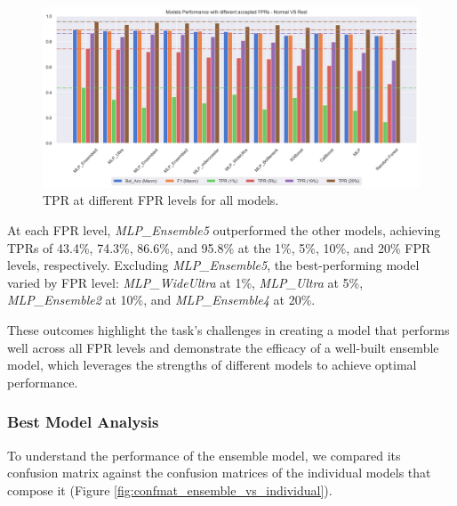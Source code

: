 \begin{figure}[htpb]
    \centering
    \includegraphics[width=1\textwidth]{./images/nomrVSrest_all.png}
    \caption{TPR at different FPR levels for all models.}
    \label{fig:normVSrest_all}
\end{figure}

At each FPR level, \textit{MLP\_Ensemble5} outperformed the other models, 
achieving TPRs of 43.4\%, 74.3\%, 86.6\%, and 95.8\% at the 1\%, 5\%, 10\%, and 20\% FPR levels, 
respectively. Excluding \textit{MLP\_Ensemble5}, the best-performing model varied by 
FPR level: \textit{MLP\_WideUltra} at 1\%, \textit{MLP\_Ultra} at 5\%, \textit{MLP\_Ensemble2} at 10\%, 
and \textit{MLP\_Ensemble4} at 20\%.

These outcomes highlight the task's challenges in creating a model that performs well across all FPR 
levels and demonstrate the efficacy of a well-built ensemble model, which leverages the strengths of 
different models to achieve optimal performance.

\subsubsection{Best Model Analysis}

To understand the performance of the ensemble model, we compared its confusion matrix against 
the confusion matrices of the individual models that compose it
(Figure \ref{fig:confmat_ensemble_vs_individual}).

